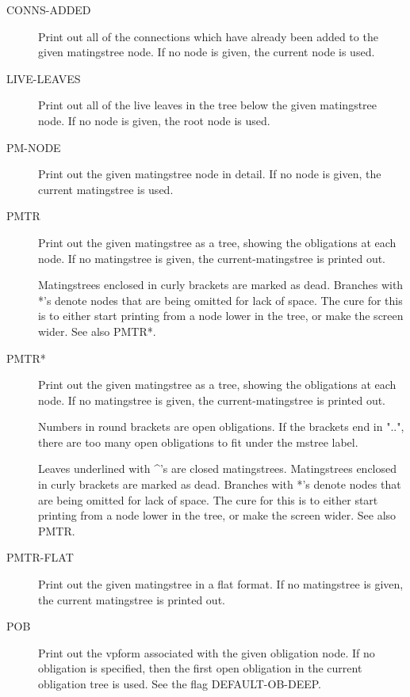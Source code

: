 \begin{description} 
\item[CONNS-ADDED]  
Print out all of the connections which have already 
been added to the given matingstree node. If no node
is given, the current node is used.

\item[LIVE-LEAVES]  
Print out all of the live leaves in the tree below 
the given matingstree node. If no node is given, the root 
node is used.

\item[PM-NODE]  
Print out the given matingstree node in detail. If no 
node is given, the current matingstree is used.

\item[PMTR]  
Print out the given matingstree as a tree, showing the obligations at each 
node. If no matingstree is given, the current-matingstree is printed out. 

Matingstrees enclosed in curly brackets are marked as dead.
Branches with *'s denote nodes that are being omitted for lack of space. The 
cure for this is to either start printing from a node lower in the tree, or 
make the screen wider. See also PMTR*.

\item[PMTR*]  
Print out the given matingstree as a tree, showing the obligations at each 
node. If no matingstree is given, the current-matingstree is printed out. 

Numbers in round brackets are open obligations. If the brackets end in "..",
there are too many open obligations to fit under the mstree label. 

Leaves underlined with \textasciicircum 's are closed matingstrees. 
Matingstrees enclosed in curly brackets are marked as dead.
Branches with *'s denote nodes that are being omitted for lack of space. The 
cure for this is to either start printing from a node lower in the tree, or 
make the screen wider. See also PMTR.

\item[PMTR-FLAT]  
Print out the given matingstree in a flat format. 
If no matingstree is given, the current matingstree is printed out.

\item[POB]  
Print out the vpform associated with the given obligation node.
If no obligation is specified, then the first open obligation 
in the current obligation tree is used. See the flag 
DEFAULT-OB-DEEP.


\end{description}
